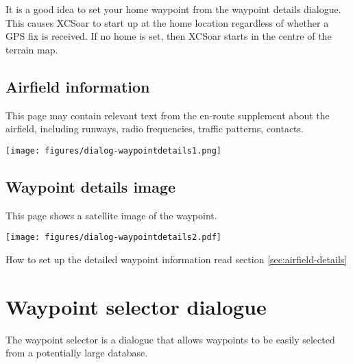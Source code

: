 It is a good idea to set your home waypoint from the waypoint details
dialogue. This causes XCSoar to start up at the home location regardless
of whether a GPS fix is received.  If no home is set, then XCSoar
starts in the centre of the terrain map.

\subsection*{Airfield information}
This page may contain relevant text from the en-route supplement about
the airfield, including runways, radio frequencies, traffic patterns,
contacts.
\begin{center}
\texttt{[image: figures/dialog-waypointdetails1.png]}
\end{center}

\subsection*{Waypoint details image}
This page shows a satellite image of the waypoint.

\begin{center}
\texttt{[image: figures/dialog-waypointdetails2.pdf]}
\end{center}
How to set up the detailed waypoint information read section \ref{sec:airfield-details}

\section{Waypoint selector dialogue}\label{sec:waypoint-selector-dialog}

The waypoint selector is a dialogue that allows waypoints to be easily selected
from a potentially large database. 


